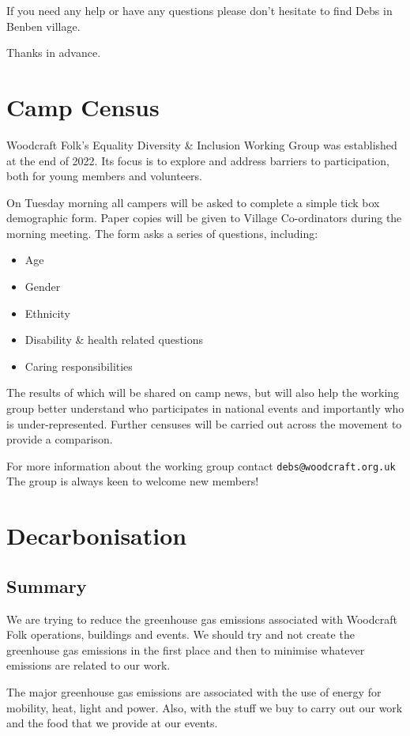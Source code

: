 \documentclass[a4paper, 11pt]{report}
\begin{document}
If you need any help or have any questions please don't hesitate to find Debs in Benben village.

Thanks in advance.\nl

\chapter{Camp Census}
Woodcraft Folk's Equality Diversity \& Inclusion Working Group was established at the end of 2022. Its focus is to explore and address barriers to participation, both for young members and volunteers. \nl

On Tuesday morning all campers will be asked to complete a simple tick box demographic form. Paper copies will be given to Village Co-ordinators during the morning meeting. The form asks a series of questions, including:
\begin{itemize}
    \item Age 
    \item Gender
    \item Ethnicity
    \item Disability \& health related questions
    \item Caring responsibilities
\end{itemize}

The results of which will be shared on camp news, but will also help the working group better understand who participates in national events and importantly who is under-represented. Further censuses will be carried out across the movement to provide a comparison.\nl

For more information about the working group contact \texttt{debs@woodcraft.org.uk} The group is always keen to welcome new members!

\chapter{Decarbonisation}
\section{Summary}
We are trying to reduce the greenhouse gas emissions associated with Woodcraft Folk operations, buildings and events. We should try and not create the greenhouse gas emissions in the first place and then to minimise whatever emissions are related to our work.\nl

The major greenhouse gas emissions are associated with the use of energy for mobility, heat, light and power. Also, with the stuff we buy to carry out our work and the food that we provide at our events.\nl
\end{document}
